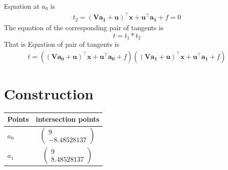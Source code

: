 \documentclass[journal,10pt,twocolumn]{article}
\let\vec\mathbf
\newcommand{\myvec}[1]{\ensuremath{\begin{pmatrix}#1\end{pmatrix}}}
\begin{document}
Equation at $a_0$ is 
\begin{align}
t_2 =({\vec{V}\vec{a_1}+\vec{u}})^{\top}\vec{x}+\vec{u}^{\top}\vec{a_1}+f=0
\end{align}
The equation of the corresponding pair of tangents is
\begin{equation}
t = t_1*t_2
\end{equation}
That is 
Equation of pair of tangents is
\begin{align}
t=(({\vec{V}\vec{a_0}+\vec{u}})^{\top}\vec{x}+\vec{u}^{\top}\vec{a_0}+f)(({\vec{V}\vec{a_1}+\vec{u}})^{\top}\vec{x}+\vec{u}^{\top}\vec{a_1}+f)
\end{align}
\section*{\large Construction}

{
\setlength\extrarowheight{5pt}
\begin{tabular}{|l|c|}
    \hline 
    \textbf{Points} & \textbf{intersection points} \\ \hline
  $a_0$ & $\myvec{
   9\\
   -8.48528137
   } $ \\\hline
  $a_1$ & $\myvec{
   9\\
   8.48528137
   } $ \\\hline
      \end{tabular}
}
\end{document}
